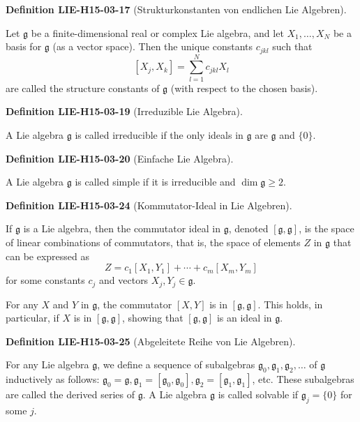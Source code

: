\documentclass[10pt, letterpaper]{article}
\newcommand{\CustomHeading}[3]{%
  \par\medskip\noindent%
  \textbf{#1 #2} \textnormal{(#3)}.\enskip%
}
\newenvironment{DEF}[2]{\CustomHeading{Definition}{#1}{#2}}{}
\begin{document}
\begin{DEF}{LIE-H15-03-17}{Strukturkonstanten von endlichen Lie Algebren}
Let $\mathfrak{g}$ be a finite-dimensional real or complex Lie algebra, and let $X_{1}, \ldots, X_{N}$ be a basis for $\mathfrak{g}$ (as a vector space). Then the unique constants $c_{j k l}$ such that
$$
\left[X_{j}, X_{k}\right]=\sum_{l=1}^{N} c_{j k l} X_{l}
$$
are called the structure constants of $\mathfrak{g}$ (with respect to the chosen basis).
\end{DEF}

\begin{DEF}{LIE-H15-03-19}{Irreduzible Lie Algebra}
A Lie algebra $\mathfrak{g}$ is called irreducible if the only ideals in $\mathfrak{g}$ are $\mathfrak{g}$ and $\{0\}$.
\end{DEF}

\begin{DEF}{LIE-H15-03-20}{Einfache Lie Algebra}
A Lie algebra $\mathfrak{g}$ is called simple if it is irreducible and $\operatorname{dim} \mathfrak{g} \geq 2$.
\end{DEF}

\begin{DEF}{LIE-H15-03-24}{Kommutator-Ideal in Lie Algebren}
If $\mathfrak{g}$ is a Lie algebra, then the commutator ideal in $\mathfrak{g}$, denoted $[\mathfrak{g}, \mathfrak{g}]$, is the space of linear combinations of commutators, that is, the space of elements $Z$ in $\mathfrak{g}$ that can be expressed as
$$
Z=c_{1}\left[X_{1}, Y_{1}\right]+\cdots+c_{m}\left[X_{m}, Y_{m}\right]
$$
for some constants $c_{j}$ and vectors $X_{j}, Y_{j} \in \mathfrak{g}$.

For any $X$ and $Y$ in $\mathfrak{g}$, the commutator $[X, Y]$ is in $[\mathfrak{g}, \mathfrak{g}]$. This holds, in particular, if $X$ is in $[\mathfrak{g}, \mathfrak{g}]$, showing that $[\mathfrak{g}, \mathfrak{g}]$ is an ideal in $\mathfrak{g}$.
\end{DEF}

\begin{DEF}{LIE-H15-03-25}{Abgeleitete Reihe von Lie Algebren}
For any Lie algebra $\mathfrak{g}$, we define a sequence of subalgebras $\mathfrak{g}_{0}, \mathfrak{g}_{1}, \mathfrak{g}_{2}, \ldots$ of $\mathfrak{g}$ inductively as follows: $\mathfrak{g}_{0}=\mathfrak{g}, \mathfrak{g}_{1}=\left[\mathfrak{g}_{0}, \mathfrak{g}_{0}\right], \mathfrak{g}_{2}=\left[\mathfrak{g}_{1}, \mathfrak{g}_{1}\right]$, etc. These subalgebras are called the derived series of $\mathfrak{g}$. A Lie algebra $\mathfrak{g}$ is called solvable if $\mathfrak{g}_{j}=\{0\}$ for some $j$.
\end{DEF}
\end{document}

